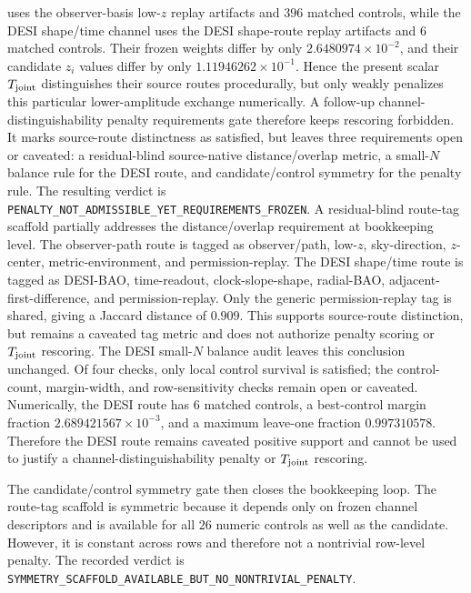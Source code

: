 \documentclass[11pt]{article}
\begin{document}
uses the observer-basis low-\(z\) replay artifacts and \(396\) matched
controls, while the DESI shape/time channel uses the DESI shape-route replay
artifacts and \(6\) matched controls.  Their frozen weights differ by only
\(2.6480974\times10^{-2}\), and their candidate \(z_i\) values differ by only
\(1.11946262\times10^{-1}\).  Hence the present scalar
\(T_{\rm joint}\) distinguishes their source routes procedurally, but only
weakly penalizes this particular lower-amplitude exchange numerically.
A follow-up channel-distinguishability penalty requirements gate therefore
keeps rescoring forbidden.  It marks source-route distinctness as satisfied,
but leaves three requirements open or caveated: a residual-blind source-native
distance/overlap metric, a small-\(N\) balance rule for the DESI route, and
candidate/control symmetry for the penalty rule.  The resulting verdict is
\texttt{PENALTY\_\allowbreak{}NOT\_\allowbreak{}ADMISSIBLE\_\allowbreak{}YET\_\allowbreak{}REQUIREMENTS\_\allowbreak{}FROZEN}.
A residual-blind route-tag scaffold partially addresses the distance/overlap
requirement at bookkeeping level.  The observer-path route is tagged as
observer/path, low-\(z\), sky-direction, \(z\)-center, metric-environment, and
permission-replay.  The DESI shape/time route is tagged as DESI-BAO,
time-readout, clock-slope-shape, radial-BAO, adjacent-first-difference, and
permission-replay.  Only the generic permission-replay tag is shared, giving a
Jaccard distance of \(0.909\).  This supports source-route distinction, but
remains a caveated tag metric and does not authorize penalty scoring or
\(T_{\rm joint}\) rescoring.
The DESI small-\(N\) balance audit leaves this conclusion unchanged.  Of four
checks, only local control survival is satisfied; the control-count,
margin-width, and row-sensitivity checks remain open or caveated.  Numerically,
the DESI route has \(6\) matched controls, a best-control margin fraction
\(2.689421567\times10^{-3}\), and a maximum leave-one fraction
\(0.997310578\).  Therefore the DESI route remains caveated positive support
and cannot be used to justify a channel-distinguishability penalty or
\(T_{\rm joint}\) rescoring.

The candidate/control symmetry gate then closes the bookkeeping loop.  The
route-tag scaffold is symmetric because it depends only on frozen channel
descriptors and is available for all \(26\) numeric controls as well as the
candidate.  However, it is constant across rows and therefore not a nontrivial
row-level penalty.  The recorded verdict is
\texttt{SYMMETRY\_\allowbreak{}SCAFFOLD\_\allowbreak{}AVAILABLE\_\allowbreak{}BUT\_\allowbreak{}NO\_\allowbreak{}NONTRIVIAL\_\allowbreak{}PENALTY}.
\end{document}
